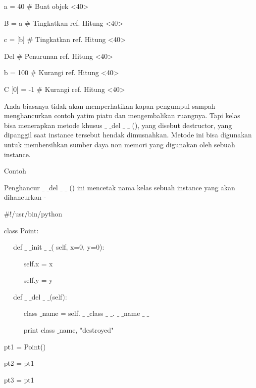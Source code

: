 \begin {enumerate}
\vspace{12pt}
\noindent 
a = 40  $  \#  $ Buat objek <40> \par
\noindent 
B = a  $  \#  $ Tingkatkan ref. Hitung <40> \par
\noindent 
c = [b]  $  \#  $ Tingkatkan ref. Hitung <40> \par
\vspace{12pt}
\noindent 
Del  $  \#  $ Penurunan ref. Hitung <40> \par
\noindent 
b = 100  $  \#  $ Kurangi ref. Hitung <40> \par
\noindent 
C [0] = -1  $  \#  $ Kurangi ref. Hitung <40> \par
\vspace{12pt}
Anda biasanya tidak akan memperhatikan kapan pengumpul sampah menghancurkan contoh yatim piatu dan mengembalikan ruangnya. Tapi kelas bisa menerapkan metode khusus  $  \_  $ $  \_  $del  $  \_  $ $  \_  $ (), yang disebut destructor, yang dipanggil saat instance tersebut hendak dimusnahkan. Metode ini bisa digunakan untuk membersihkan sumber daya non memori yang digunakan oleh sebuah instance. \par
\noindent 
Contoh \par
\vspace{12pt}
\noindent 
Penghancur  $  \_  $ $  \_  $del  $  \_  $ $  \_  $ () ini mencetak nama kelas sebuah instance yang akan dihancurkan - \par
\noindent 
 $  \#  $!/usr/bin/python \par
\vspace{12pt}
\noindent 
class Point: \par
\noindent 
~~ def  $  \_  $ $  \_  $init $  \_  $ $  \_  $( self, x=0, y=0): \par
\noindent 
~~~~~ self.x = x \par
\noindent 
~~~~~ self.y = y \par
\noindent 
~~ def  $  \_  $ $  \_  $del $  \_  $ $  \_  $(self): \par
\noindent 
~~~~~ class $  \_  $name = self. $  \_  $ $  \_  $class $  \_  $ $  \_  $. $  \_  $ $  \_  $name $  \_  $ $  \_  $ \par
\noindent 
~~~~~ print class $  \_  $name, "destroyed" \par
\vspace{12pt}
\noindent 
pt1 = Point() \par
\noindent 
pt2 = pt1 \par
\noindent 
pt3 = pt1 \par
\noindent 

\end{enumerate}
